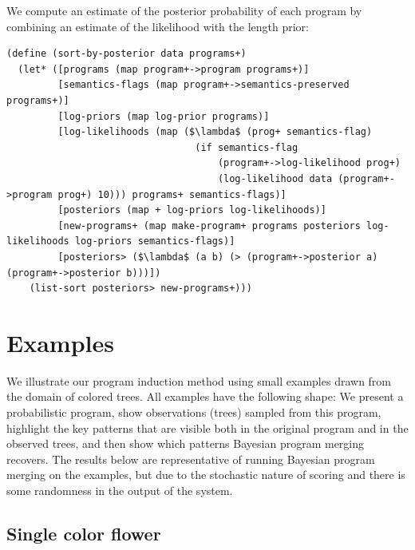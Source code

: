 \documentclass[a4paper,10pt]{article}
\begin{document}
We compute an estimate of the posterior probability of each program by combining an estimate of the likelihood with the length prior:
\begin{lstlisting}[frame=trbl]
(define (sort-by-posterior data programs+)
  (let* ([programs (map program+->program programs+)]
         [semantics-flags (map program+->semantics-preserved programs+)]
         [log-priors (map log-prior programs)]
         [log-likelihoods (map ($\lambda$ (prog+ semantics-flag)
                                 (if semantics-flag
                                     (program+->log-likelihood prog+)
                                     (log-likelihood data (program+->program prog+) 10))) programs+ semantics-flags)]
         [posteriors (map + log-priors log-likelihoods)] 
         [new-programs+ (map make-program+ programs posteriors log-likelihoods log-priors semantics-flags)]
         [posteriors> ($\lambda$ (a b) (> (program+->posterior a) (program+->posterior b)))])
    (list-sort posteriors> new-programs+)))
\end{lstlisting}


\newpage
\section{Examples}

We illustrate our program induction method using small examples drawn from the domain of colored trees. All examples have the following shape: We present a probabilistic program, show observations (trees) sampled from this program, highlight the key patterns that are visible both in the original program and in the observed trees, and then show which patterns Bayesian program merging recovers.  The results below are representative of running Bayesian program merging on the examples, but due to the stochastic nature of scoring and there is some randomness in the output of the system.

\subsection{Single color flower}
\end{document}
